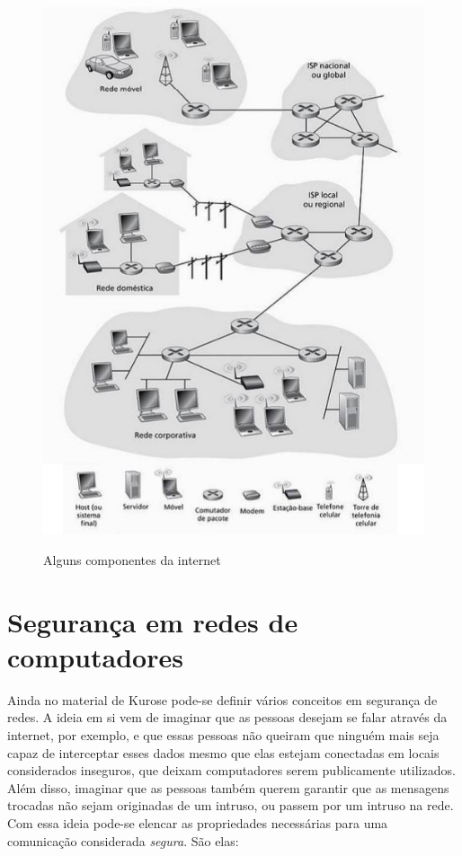 \begin{figure}[H]
\caption{\small Alguns componentes da internet}
\centering
\includegraphics[scale=1.3]{figs/fig3.JPG}
\label{f.internet_01}
\end{figure}

\section{Segurança em redes de computadores}
\label{s.seguranca}

Ainda no material de Kurose pode-se definir vários conceitos em segurança de
redes. A ideia em si vem de imaginar que as pessoas desejam se falar através
da internet, por exemplo, e que essas pessoas não queiram que ninguém mais
seja capaz de interceptar esses dados mesmo que elas estejam conectadas em
locais considerados inseguros, que deixam computadores serem publicamente
utilizados. Além disso, imaginar que as pessoas também querem garantir que as
mensagens trocadas não sejam originadas de um intruso, ou passem por um
intruso na rede. Com essa ideia pode-se elencar as propriedades necessárias
para uma comunicação considerada \emph{segura}. São elas:

